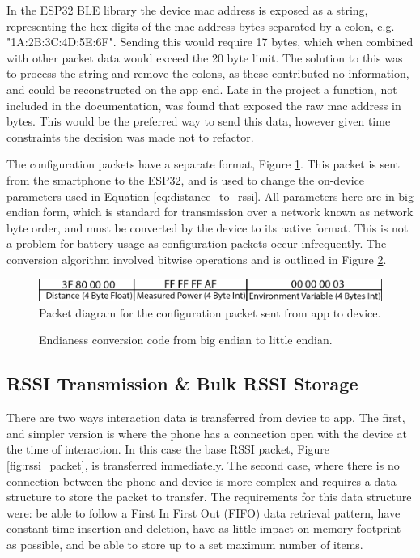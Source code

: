 \documentclass{l4proj}
\begin{document}
In the ESP32 BLE library the device mac address is exposed as a string, representing the hex digits of the mac address bytes separated by a colon, e.g. "1A:2B:3C:4D:5E:6F". Sending this would require 17 bytes, which when combined with other packet data would exceed the 20 byte limit. The solution to this was to process the string and remove the colons, as these contributed no information, and could be reconstructed on the app end. Late in the project a function, not included in the documentation, was found that exposed the raw mac address in bytes. This would be the preferred way to send this data, however given time constraints the decision was made not to refactor.

The configuration packets have a separate format, Figure \ref{fig:config_packet}. This packet is sent from the smartphone to the ESP32, and is used to change the on-device parameters used in Equation \ref{eq:distance_to_rssi}. All parameters here are in big endian form, which is standard for transmission over a network known as network byte order, and must be converted by the device to its native format. This is not a problem for battery usage as configuration packets occur infrequently. The conversion algorithm involved bitwise operations and is outlined in Figure \ref{cde:conversion}.

\begin{figure}[!htb]
    \centering
    \includegraphics[width=1.0\linewidth]{images/config_packet.png}

    \caption{ Packet diagram for the configuration packet sent from app to device. }

    \label{fig:config_packet}
\end{figure}

\begin{figure}[!htb]
    
    \caption{ Endianess conversion code from big endian to little endian. }
    \label{cde:conversion}
\end{figure}

\subsection{RSSI Transmission \& Bulk RSSI Storage}

There are two ways interaction data is transferred from device to app. The first, and simpler version is where the phone has a connection open with the device at the time of interaction. In this case the base RSSI packet, Figure \ref{fig:rssi_packet}, is transferred immediately. The second case, where there is no connection between the phone and device is more complex and requires a data structure to store the packet to transfer. The requirements for this data structure were: be able to follow a First In First Out (FIFO) data retrieval pattern, have constant time insertion and deletion, have as little impact on memory footprint as possible, and be able to store up to a set maximum number of items.
\end{document}
